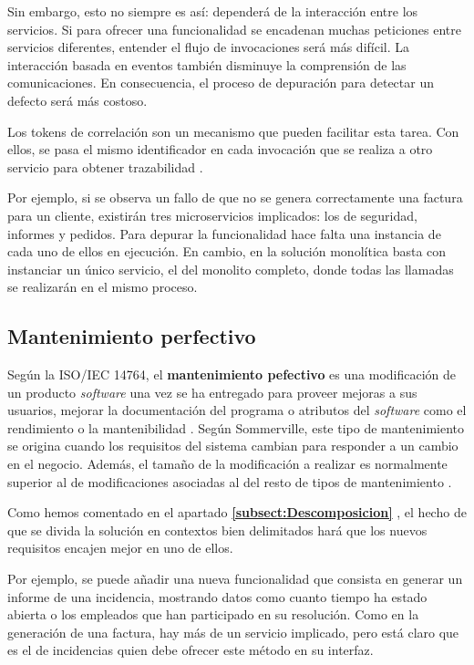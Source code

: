 \documentclass[11pt,spanish,listoffigures]{tfgetsinf}
\begin{document}
Sin embargo, esto no siempre es así: dependerá de la interacción entre los servicios. Si para ofrecer una funcionalidad se encadenan muchas peticiones entre servicios diferentes, entender el flujo de invocaciones será más difícil. La interacción basada en eventos también disminuye la comprensión de las comunicaciones. En consecuencia, el proceso de depuración para detectar un defecto será más costoso. 

Los tokens de correlación son un mecanismo que pueden facilitar esta tarea. Con ellos, se pasa el mismo identificador en cada invocación que se realiza a otro servicio para obtener trazabilidad \cite{Baum2016}.

Por ejemplo, si se observa un fallo de que no se genera correctamente una factura para un cliente, existirán tres microservicios implicados: los de seguridad, informes y pedidos. Para depurar la funcionalidad hace falta una instancia de cada uno de ellos en ejecución. En cambio, en la solución monolítica basta con instanciar un único servicio, el del monolito completo, donde todas las llamadas se realizarán en el mismo proceso.

\subsection{Mantenimiento perfectivo}


Según la ISO/IEC 14764, el \textbf{mantenimiento pefectivo} es una modificación de un producto \textit{software} una vez se ha entregado para proveer mejoras a sus usuarios, mejorar la documentación del programa o atributos del \textit{software} como el rendimiento o la mantenibilidad \cite{Bourque2014}. Según Sommerville, este tipo de mantenimiento se origina cuando los requisitos del sistema cambian para responder a un cambio en el negocio. Además, el tamaño de la modificación a realizar es normalmente superior al de modificaciones asociadas al del resto de tipos de mantenimiento \cite{Sommerville2010}.

Como hemos comentado en el apartado \textbf{\ref{subsect:Descomposicion} }, el hecho de que se divida la solución en contextos bien delimitados hará que los nuevos requisitos encajen mejor en uno de ellos.

Por ejemplo, se puede añadir una nueva funcionalidad que consista en generar un informe de una incidencia, mostrando datos como cuanto tiempo ha estado abierta o los empleados que han participado en su resolución. Como en la generación de una factura, hay más de un servicio implicado, pero está claro que es el de incidencias quien debe ofrecer este método en su interfaz.
\end{document}
